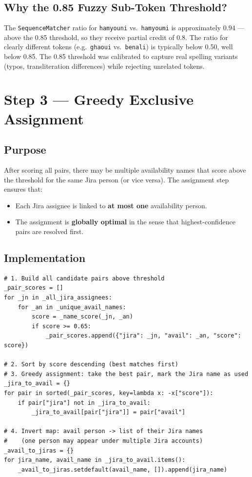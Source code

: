 \documentclass[12pt, a4paper]{article}
\begin{document}
\subsection{Why the 0.85 Fuzzy Sub-Token Threshold?}

The \texttt{SequenceMatcher} ratio for \texttt{hamyouni} vs.\ \texttt{hamyoumi} is
approximately $0.94$ — above the 0.85 threshold, so they receive partial credit of 0.8.
The ratio for clearly different tokens (e.g.\ \texttt{ghaoui} vs.\ \texttt{benali})
is typically below 0.50, well below 0.85. The 0.85 threshold was calibrated to capture
real spelling variants (typos, transliteration differences) while rejecting unrelated tokens.

\section{Step 3 — Greedy Exclusive Assignment}

\subsection{Purpose}

After scoring all pairs, there may be multiple availability names that score above the
threshold for the same Jira person (or vice versa). The assignment step ensures that:

\begin{itemize}
    \item Each Jira assignee is linked to \textbf{at most one} availability person.
    \item The assignment is \textbf{globally optimal} in the sense that highest-confidence
          pairs are resolved first.
\end{itemize}

\subsection{Implementation}

\begin{lstlisting}[style=python, caption={Greedy exclusive one-to-one assignment}]
# 1. Build all candidate pairs above threshold
_pair_scores = []
for _jn in _all_jira_assignees:
    for _an in _unique_avail_names:
        score = _name_score(_jn, _an)
        if score >= 0.65:
            _pair_scores.append({"jira": _jn, "avail": _an, "score": score})

# 2. Sort by score descending (best matches first)
# 3. Greedy assignment: take the best pair, mark the Jira name as used
_jira_to_avail = {}
for pair in sorted(_pair_scores, key=lambda x: -x["score"]):
    if pair["jira"] not in _jira_to_avail:
        _jira_to_avail[pair["jira"]] = pair["avail"]

# 4. Invert map: avail person -> list of their Jira names
#    (one person may appear under multiple Jira accounts)
_avail_to_jiras = {}
for jira_name, avail_name in _jira_to_avail.items():
    _avail_to_jiras.setdefault(avail_name, []).append(jira_name)
\end{lstlisting}
\end{document}
